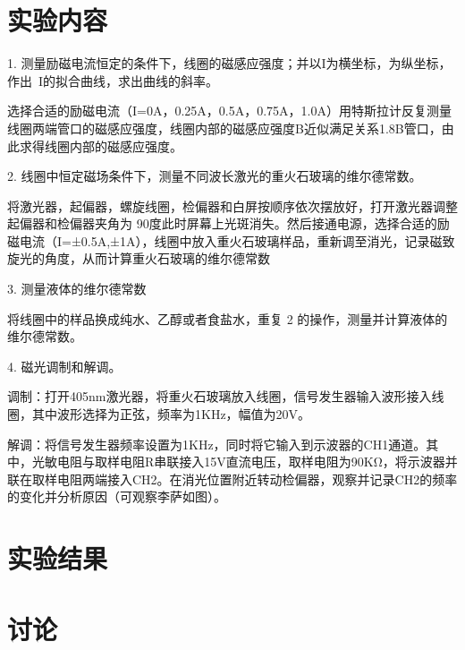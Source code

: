 \documentclass[hyperref]{ctexart}
\begin{document}
	\section{实验内容}
	1. 测量励磁电流恒定的条件下，线圈的磁感应强度；并以I为横坐标，为纵坐标，作出~I的拟合曲线，求出曲线的斜率。

	选择合适的励磁电流（I=0A，0.25A，0.5A，0.75A，1.0A）用特斯拉计反复测量线圈两端管口的磁感应强度，线圈内部的磁感应强度B近似满足关系1.8B管口，由此求得线圈内部的磁感应强度。

	2. 线圈中恒定磁场条件下，测量不同波长激光的重火石玻璃的维尔德常数。

	将激光器，起偏器，螺旋线圈，检偏器和白屏按顺序依次摆放好，打开激光器调整起偏器和检偏器夹角为 90度此时屏幕上光斑消失。然后接通电源，选择合适的励磁电流（I=±0.5A,±1A），线圈中放入重火石玻璃样品，重新调至消光，记录磁致旋光的角度，从而计算重火石玻璃的维尔德常数

	3. 测量液体的维尔德常数

	将线圈中的样品换成纯水、乙醇或者食盐水，重复 2 的操作，测量并计算液体的维尔德常数。

	4. 磁光调制和解调。

	调制：打开405nm激光器，将重火石玻璃放入线圈，信号发生器输入波形接入线圈，其中波形选择为正弦，频率为1KHz，幅值为20V。

	解调：将信号发生器频率设置为1KHz，同时将它输入到示波器的CH1通道。其中，光敏电阻与取样电阻R串联接入15V直流电压，取样电阻为90KΩ，将示波器并联在取样电阻两端接入CH2。在消光位置附近转动检偏器，观察并记录CH2的频率的变化并分析原因（可观察李萨如图）。

	\section{实验结果}
	\section{讨论}













\end{document}
